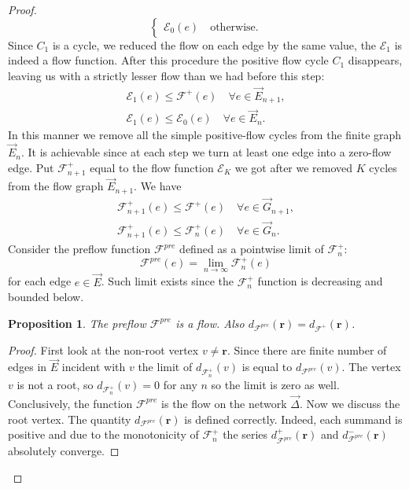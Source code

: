 \documentclass[12pt]{article}
\renewcommand{\cal}[1]{\mathcal{#1}}
\renewcommand{\leq}{\leqslant}
\newtheorem{prop}{Proposition}
\theoremstyle{definition}
\newcommand{\flowpos}{\mathcal{F}^{+}}
\newcommand{\preflow}{\mathcal{F}^{pre}}
\newcommand{\flowposn}[1]{\mathcal{F}_{#1}^{+}}
\renewcommand{\root}{\mathbf{r}}
\newcommand{\onet}{\vec{\Delta}}
\numberwithin{remark}{section}
\numberwithin{theorem}{section}
\numberwithin{prop}{section}
\numberwithin{equation}{section}
\numberwithin{lemma}{section}
\numberwithin{prop_under_lemma}{lemma}
\begin{document}
\begin{proof}
\begin{equation*}
\begin{cases}
          \cal{E}_0(e) \quad \text{otherwise}.
        \end{cases}
      \end{equation*}
      Since $C_1$ is a cycle, we reduced the flow on each edge by the same value,
        the $\cal{E}_1$ is indeed a flow function.
      After this procedure the positive flow cycle $C_1$ disappears,
        leaving us with a strictly lesser flow than we had before this step:
      \begin{align*}
        \cal{E}_1(e) \leq \flowpos(e) \quad \forall e \in \vec{E}_{n+1},\\
        \cal{E}_1(e) \leq \cal{E}_0(e) \quad \forall e \in \vec{E}_n.
      \end{align*}
      In this manner we remove all the simple positive-flow cycles from the finite graph $\vec{E}_n$.
      It is achievable since at each step we turn at least one edge into a zero-flow edge.
      Put $\flowposn{n+1}$ equal to the flow function $\cal{E}_K$ we got after we removed $K$ cycles from the flow graph $\vec{E}_{n+1}$.
      We have
      \begin{align*}
        \flowposn{n+1}(e) \leq \flowpos(e) \quad \forall e \in \vec{G}_{n+1},\\
        \flowposn{n+1}(e) \leq \flowposn{n}(e) \quad \forall e \in \vec{G}_n.
      \end{align*}
      Consider the preflow function $\preflow$ defined as a pointwise limit of $\flowposn{n}$:
      \[
        \preflow(e) = \lim_{n\to \infty}\flowposn{n}(e)
      \]
        for each edge $e \in \vec{E}$.
      Such limit exists since the $\flowposn{n}$ function is decreasing and bounded below.
      \begin{prop}
        The preflow $\preflow$ is a flow.
        Also $d_{\preflow}(\root) = d_{\flowpos}(\root)$.
      \end{prop}
      \begin{proof}
        First look at the non-root vertex $v \neq \root$.
        Since there are finite number of edges in $\vec{E}$ incident with $v$ the limit of
        $d_{\flowposn{n}}(v)$ is equal to $d_{\preflow}(v)$.
        The vertex $v$ is not a root, so $d_{\flowposn{n}}(v) = 0$ for any $n$ so the limit is zero as well.
        Conclusively, the function $\preflow$ is the flow on the network $\onet$.
        Now we discuss the root vertex.
        The quantity $d_{\preflow}(\root)$ is defined correctly.
        Indeed, each summand is positive and due to the monotonicity of $\flowposn{n}$ the series
          $d^{+}_{\preflow}(\root)$ and $d^{-}_{\preflow}(\root)$ absolutely converge.

\end{proof}
\end{proof}
\end{document}
